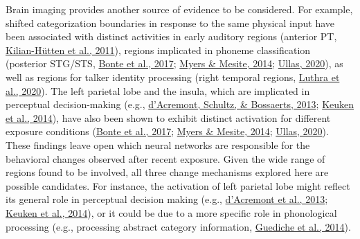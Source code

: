 \documentclass[
  11pt,
  english,
  man,floatsintext]{apa6}
\begin{document}
Brain imaging provides another source of evidence to be considered. For example, shifted categorization boundaries in response to the same physical input have been associated with distinct activities in early auditory regions (anterior PT, \protect\hyperlink{ref-kilianhutten2011}{Kilian-Hütten et al., 2011}), regions implicated in phoneme classification (posterior STG/STS, \protect\hyperlink{ref-bonte2017}{Bonte et al., 2017}; \protect\hyperlink{ref-myers-mesite2014}{Myers \& Mesite, 2014}; \protect\hyperlink{ref-ullas2020}{Ullas, 2020}), as well as regions for talker identity processing (right temporal regions, \protect\hyperlink{ref-luthra2020}{Luthra et al., 2020}). The left parietal lobe and the insula, which are implicated in perceptual decision-making (e.g., \protect\hyperlink{ref-dacremont2013}{d'Acremont, Schultz, \& Bossaerts, 2013}; \protect\hyperlink{ref-keuken2014}{Keuken et al., 2014}), have also been shown to exhibit distinct activation for different exposure conditions (\protect\hyperlink{ref-bonte2017}{Bonte et al., 2017}; \protect\hyperlink{ref-myers-mesite2014}{Myers \& Mesite, 2014}; \protect\hyperlink{ref-ullas2020}{Ullas, 2020}). These findings leave open which neural networks are responsible for the behavioral changes observed after recent exposure. Given the wide range of regions found to be involved, all three change mechanisms explored here are possible candidates. For instance, the activation of left parietal lobe might reflect its general role in perceptual decision making (e.g., \protect\hyperlink{ref-dacremont2013}{d'Acremont et al., 2013}; \protect\hyperlink{ref-keuken2014}{Keuken et al., 2014}), or it could be due to a more specific role in phonological processing (e.g., processing abstract category information, \protect\hyperlink{ref-guediche2014}{Guediche et al., 2014}).
\end{document}
